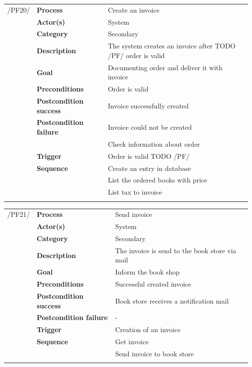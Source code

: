 \documentclass[11pt,a4paper,oneside,svgnames]{report}
\begin{document}
\noindent
\begin{tabular}{p{1.5cm}p{3cm}p{8cm}}
\cellcolor{white}/PF20/	& \textbf{Process} & Create an invoice\\
\cellcolor{white}		& \textbf{Actor(s)} & System\\
\cellcolor{white}		& \textbf{Category} & Secondary\\
\cellcolor{white}		& \textbf{Description}	 & The system creates an invoice after TODO /PF/ order is valid\\
\cellcolor{white}		& \textbf{Goal} & Documenting order and deliver it with invoice\\
\cellcolor{white}		& \textbf{Preconditions} & Order is valid\\
\cellcolor{white}		& \textbf{Postcondition success} & Invoice successfully created\\
\cellcolor{white}		& \textbf{Postcondition failure} & Invoice could not be created\\
\cellcolor{white}		& & Check information about order\\
\cellcolor{white}		& \textbf{Trigger} & Order is valid TODO /PF/\\
\cellcolor{white}		& \textbf{Sequence} & Create an entry in database\\
\cellcolor{white}		& & List the ordered books with price\\
\cellcolor{white}		& & List tax to invoice\\
\cellcolor{white}\hfill \\
\end{tabular}

\noindent
\begin{tabular}{p{1.5cm}p{3cm}p{8cm}}
\cellcolor{white}/PF21/	& \textbf{Process} & Send invoice\\
\cellcolor{white}		& \textbf{Actor(s)} & System\\
\cellcolor{white}		& \textbf{Category} & Secondary\\
\cellcolor{white}		& \textbf{Description}	 & The invoice is send to the book store via mail\\
\cellcolor{white}		& \textbf{Goal} & Inform the book shop\\
\cellcolor{white}		& \textbf{Preconditions} & Successful created invoice\\
\cellcolor{white}		& \textbf{Postcondition success} & Book store receives a notification mail\\
\cellcolor{white}		& \textbf{Postcondition failure} & -\\
\cellcolor{white}		& \textbf{Trigger} & Creation of an invoice\\
\cellcolor{white}		& \textbf{Sequence} & Get invoice\\
\cellcolor{white}		& & Send invoice to book store\\
\cellcolor{white}\hfill \\
\end{tabular}
\end{document}
